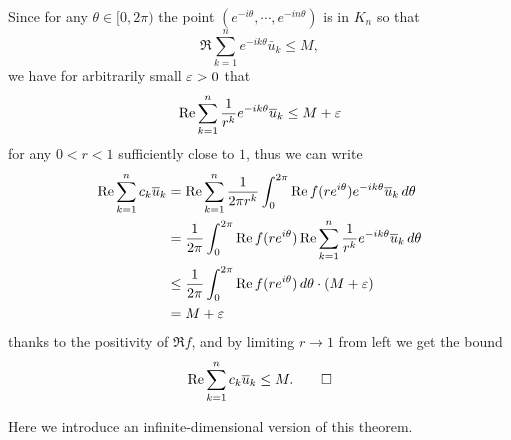 \documentclass{../../small}
\begin{document}
\begin{pf}
Since for any $\theta\in[0,2\pi)$ the point $(e^{-i\theta},\cdots,e^{-in\theta})$ is in $K_n$ so that
\[\Re\sum_{k=1}^ne^{-ik\theta}\bar u_k\le M,\]
we have for arbitrarily small $\e>0$ that
\[\Re\sum_{k=1}^n\frac1{r^k}e^{-ik\theta}\bar u_k\le M+\e\]
for any $0<r<1$ sufficiently close to $1$, thus we can write
\begin{align*}
\Re\sum_{k=1}^nc_k\bar u_k
&=\Re\sum_{k=1}^n\frac1{2\pi r^k}\int_0^{2\pi}\Re f(re^{i\theta})e^{-ik\theta}\bar u_k\,d\theta\\
&=\frac1{2\pi}\int_0^{2\pi}\Re f(re^{i\theta})\Re\sum_{k=1}^n\frac1{r^k}e^{-ik\theta}\bar u_k\,d\theta\\
&\le\frac1{2\pi}\int_0^{2\pi}\Re f(re^{i\theta})\,d\theta\cdot(M+\e)\\
&=M+\e
\end{align*}
thanks to the positivity of $\Re f$, and by limiting $r\to1$ from left we get the bound
\[\Re\sum_{k=1}^nc_k\bar u_k\le M.\qedhere\]
\end{pf}

Here we introduce an infinite-dimensional version of this theorem.
\end{document}
